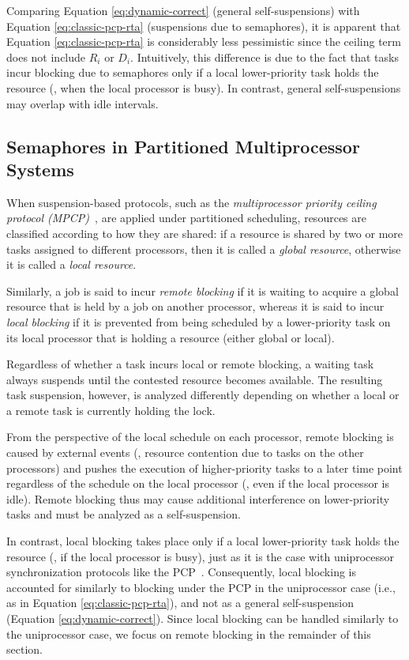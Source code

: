 Comparing Equation \ref{eq:dynamic-correct} (general self-suspensions) with Equation  \ref{eq:classic-pcp-rta} (suspensions due to semaphores), it is apparent that Equation \ref{eq:classic-pcp-rta} is considerably less pessimistic since the ceiling term does not include $R_i$ or $D_i$. Intuitively, this difference is due to the fact that tasks incur blocking due to semaphores only if a local lower-priority task holds the resource (\ie, when the local processor is busy). In contrast, general self-suspensions may overlap with idle intervals.


\subsection{Semaphores in Partitioned Multiprocessor Systems}
\label{sec:sem-multi}

When suspension-based protocols, such as the \emph{multiprocessor priority ceiling protocol (MPCP)}~\cite{rajkumar-1990}, are applied under partitioned scheduling, resources are classified according to how they are shared: if a resource is shared by two or more tasks assigned to different processors, then it is called a \emph{global resource}, otherwise it is called a \emph{local resource}.

Similarly, a job is said to incur \emph{remote blocking} if it is waiting to acquire a global resource that is held by a job on another processor, whereas it is said to incur \emph{local blocking} if it is prevented from being scheduled by a lower-priority task on its local processor that is holding a resource (either global or local).

Regardless of whether a task incurs local or remote blocking, a waiting task always suspends until the contested resource becomes available. The resulting task suspension, however, is analyzed differently depending on whether a local or a remote task is currently holding the lock.

From the perspective of the local schedule on each processor, remote blocking is caused by external events (\ie, resource contention due to tasks on the other processors) and pushes the execution of higher-priority tasks to a later time point regardless of the schedule on the local processor (\ie, even if the local processor is idle). Remote blocking thus may cause additional interference on lower-priority tasks and must be analyzed as a self-suspension.

In contrast, local blocking takes place only if a local lower-priority task holds the resource (\ie, if the local processor is busy), just as it is the case with uniprocessor synchronization protocols like the PCP~\cite{SRL:90}. Consequently, local blocking is accounted for similarly to blocking under the PCP in the uniprocessor case (i.e., as in Equation \ref{eq:classic-pcp-rta}), and not as a general self-suspension (Equation \ref{eq:dynamic-correct}). Since local blocking can be handled similarly to the uniprocessor case, we focus on remote blocking in the remainder of this section.


